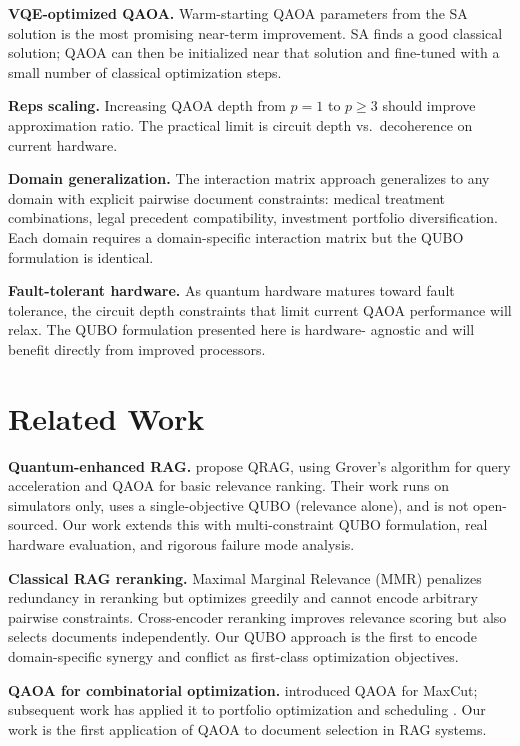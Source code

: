 \documentclass{article}
\begin{document}
\textbf{VQE-optimized QAOA.} Warm-starting QAOA parameters from the SA
solution \cite{warmstart2021} is the most promising near-term
improvement. SA finds a good classical solution; QAOA can then be
initialized near that solution and fine-tuned with a small number of
classical optimization steps.

\textbf{Reps scaling.} Increasing QAOA depth from $p=1$ to $p \geq 3$
should improve approximation ratio. The practical limit is circuit depth
vs.\ decoherence on current hardware.

\textbf{Domain generalization.} The interaction matrix approach
generalizes to any domain with explicit pairwise document constraints:
medical treatment combinations, legal precedent compatibility,
investment portfolio diversification. Each domain requires a
domain-specific interaction matrix but the QUBO formulation is
identical.

\textbf{Fault-tolerant hardware.} As quantum hardware matures toward
fault tolerance, the circuit depth constraints that limit current QAOA
performance will relax. The QUBO formulation presented here is hardware-
agnostic and will benefit directly from improved processors.

\section{Related Work}
\label{sec:related}

\textbf{Quantum-enhanced RAG.} \citet{qrag2025} propose QRAG, using
Grover's algorithm for query acceleration and QAOA for basic relevance
ranking. Their work runs on simulators only, uses a single-objective
QUBO (relevance alone), and is not open-sourced. Our work extends this
with multi-constraint QUBO formulation, real hardware evaluation, and
rigorous failure mode analysis.

\textbf{Classical RAG reranking.} Maximal Marginal Relevance (MMR)
\cite{carbonell1998mmr} penalizes redundancy in reranking but optimizes
greedily and cannot encode arbitrary pairwise constraints.
Cross-encoder reranking \cite{nogueira2019passage} improves relevance
scoring but also selects documents independently. Our QUBO approach is
the first to encode domain-specific synergy and conflict as first-class
optimization objectives.

\textbf{QAOA for combinatorial optimization.} \citet{farhi2014qaoa}
introduced QAOA for MaxCut; subsequent work has applied it to portfolio
optimization \cite{mugel2022portfolio} and scheduling
\cite{venturelli2016scheduling}. Our work is the first application of
QAOA to document selection in RAG systems.
\end{document}
